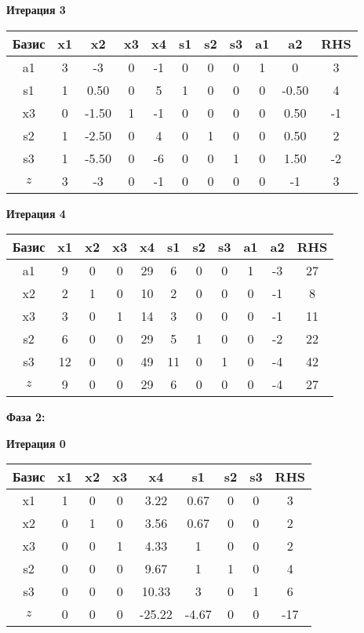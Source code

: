 \documentclass[a4paper,12pt]{article}
\begin{document}
 \textbf{Итерация 3}\\
\begin{tabular}{|c|c|c|c|c|c|c|c|c|c|c|}
\hline
Базис & x1 & x2 & x3 & x4 & s1 & s2 & s3 & a1 & a2 & RHS \\ \hline
a1 & 3 & -3 & 0 & -1 & 0 & 0 & 0 & 1 & 0 & 3 \\ \hline
s1 & 1 & 0.50 & 0 & 5 & 1 & 0 & 0 & 0 & -0.50 & 4 \\ \hline
x3 & 0 & -1.50 & 1 & -1 & 0 & 0 & 0 & 0 & 0.50 & -1 \\ \hline
s2 & 1 & -2.50 & 0 & 4 & 0 & 1 & 0 & 0 & 0.50 & 2 \\ \hline
s3 & 1 & -5.50 & 0 & -6 & 0 & 0 & 1 & 0 & 1.50 & -2 \\ \hline
$z$ & 3 & -3 & 0 & -1 & 0 & 0 & 0 & 0 & -1 & 3 \\ \hline
\end{tabular}
\vspace{5mm}

 \textbf{Итерация 4}\\
\begin{tabular}{|c|c|c|c|c|c|c|c|c|c|c|}
\hline
Базис & x1 & x2 & x3 & x4 & s1 & s2 & s3 & a1 & a2 & RHS \\ \hline
a1 & 9 & 0 & 0 & 29 & 6 & 0 & 0 & 1 & -3 & 27 \\ \hline
x2 & 2 & 1 & 0 & 10 & 2 & 0 & 0 & 0 & -1 & 8 \\ \hline
x3 & 3 & 0 & 1 & 14 & 3 & 0 & 0 & 0 & -1 & 11 \\ \hline
s2 & 6 & 0 & 0 & 29 & 5 & 1 & 0 & 0 & -2 & 22 \\ \hline
s3 & 12 & 0 & 0 & 49 & 11 & 0 & 1 & 0 & -4 & 42 \\ \hline
$z$ & 9 & 0 & 0 & 29 & 6 & 0 & 0 & 0 & -4 & 27 \\ \hline
\end{tabular}
\vspace{5mm}

\textbf{Фаза 2:}


 \textbf{Итерация 0}\\
\begin{tabular}{|c|c|c|c|c|c|c|c|c|}
\hline
Базис & x1 & x2 & x3 & x4 & s1 & s2 & s3 & RHS \\ \hline
x1 & 1 & 0 & 0 & 3.22 & 0.67 & 0 & 0 & 3 \\ \hline
x2 & 0 & 1 & 0 & 3.56 & 0.67 & 0 & 0 & 2 \\ \hline
x3 & 0 & 0 & 1 & 4.33 & 1 & 0 & 0 & 2 \\ \hline
s2 & 0 & 0 & 0 & 9.67 & 1 & 1 & 0 & 4 \\ \hline
s3 & 0 & 0 & 0 & 10.33 & 3 & 0 & 1 & 6 \\ \hline
$z$ & 0 & 0 & 0 & -25.22 & -4.67 & 0 & 0 & -17 \\ \hline
\end{tabular}
\vspace{5mm}
\end{document}
